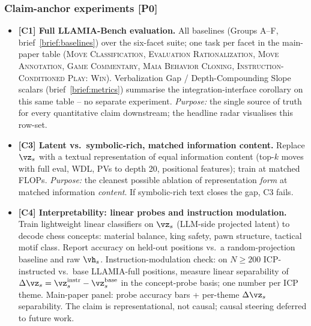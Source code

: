 \subsubsection*{Claim-anchor experiments [P0]}

\begin{itemize}[leftmargin=*]
    \item \textbf{[C1] Full LLAMIA-Bench evaluation.} All baselines
    (Groups A--F, brief~\ref{brief:baselines}) over the six-facet
    suite; one task per facet in the main-paper table
    (\textsc{Move Classification}, \textsc{Evaluation Rationalization}, \textsc{Move Annotation},
    \textsc{Game Commentary}, \textsc{Maia Behavior Cloning}, \textsc{Instruction-Conditioned Play: Win}). Verbalization Gap / Depth-Compounding Slope scalars
    (brief~\ref{brief:metrics}) summarise the integration-interface
    corollary on this same table -- no separate experiment.
    \emph{Purpose:} the single source of truth for every quantitative
    claim downstream; the headline radar visualises this row-set.


    \item \textbf{[C3] Latent vs.\ symbolic-rich, matched information
    content.} Replace $\vz_s$ with a textual representation of equal
    information content (top-$k$ moves with full eval, WDL, PVs to
    depth 20, positional features); train at matched FLOPs.
    \emph{Purpose:} the cleanest possible ablation of representation
    \emph{form} at matched information \emph{content}. If symbolic-rich
    text closes the gap, C3 fails.
    \item \textbf{[C4] Interpretability: linear probes and instruction
    modulation.}
    Train lightweight linear classifiers on $\vz_s$ (LLM-side projected
    latent) to decode chess concepts: material balance, king safety,
    pawn structure, tactical motif class. Report accuracy on held-out
    positions vs.\ a random-projection baseline and raw $\vh_s$.
    Instruction-modulation check: on $N \geq 200$ ICP-instructed vs.\
    base LLAMIA-full positions, measure linear separability of
    $\Delta\vz_s = \vz_s^{\text{instr}} - \vz_s^{\text{base}}$ in
    the concept-probe basis; one number per ICP theme.
    Main-paper panel: probe accuracy bars + per-theme $\Delta\vz_s$
    separability. The claim is representational, not causal; causal
    steering deferred to future work.


\end{itemize}

